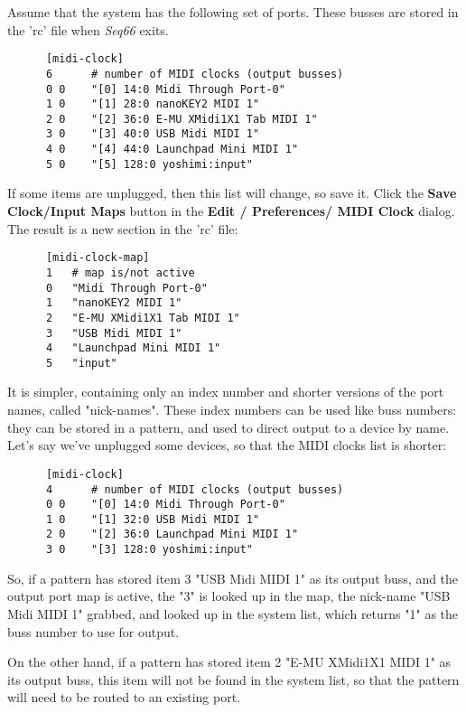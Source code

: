    Assume that the system has the following set of ports.  These busses are
   stored in the 'rc' file when \textsl{Seq66} exits.

   \begin{verbatim}
      [midi-clock]
      6      # number of MIDI clocks (output busses)
      0 0    "[0] 14:0 Midi Through Port-0"
      1 0    "[1] 28:0 nanoKEY2 MIDI 1"
      2 0    "[2] 36:0 E-MU XMidi1X1 Tab MIDI 1"
      3 0    "[3] 40:0 USB Midi MIDI 1"
      4 0    "[4] 44:0 Launchpad Mini MIDI 1"
      5 0    "[5] 128:0 yoshimi:input"
   \end{verbatim}

   If some items are unplugged, then this list will change, so save it.
   Click the
   \textbf{Save Clock/Input Maps} button in the
   \textbf{Edit / Preferences/ MIDI Clock} dialog. 
   The result is a new section in the 'rc' file:

   \begin{verbatim}
      [midi-clock-map]
      1   # map is/not active
      0   "Midi Through Port-0"
      1   "nanoKEY2 MIDI 1"
      2   "E-MU XMidi1X1 Tab MIDI 1"
      3   "USB Midi MIDI 1"
      4   "Launchpad Mini MIDI 1"
      5   "input"
   \end{verbatim}
   
   It is simpler, containing only an index number and shorter versions of the
   port names, called "nick-names".  These index numbers can be used like buss
   numbers: they can be stored in a pattern, and used to direct output to a
   device by name.  Let's say we've unplugged some devices, so that the MIDI
   clocks list is shorter:

   \begin{verbatim}
      [midi-clock]
      4      # number of MIDI clocks (output busses)
      0 0    "[0] 14:0 Midi Through Port-0"
      1 0    "[1] 32:0 USB Midi MIDI 1"
      2 0    "[2] 36:0 Launchpad Mini MIDI 1"
      3 0    "[3] 128:0 yoshimi:input"
   \end{verbatim}

   So, if a pattern has stored item 3 "USB Midi MIDI 1" as its output buss,
   and the output port map is active, the "3" is looked up in the map, the
   nick-name "USB Midi MIDI 1" grabbed, and looked up in the system list, which
   returns "1" as the buss number to use for output.

   On the other hand, if a pattern has stored item 2 "E-MU XMidi1X1 MIDI 1" as
   its output buss, this item will not be found in the system list, so that the
   pattern will need to be routed to an existing port.

